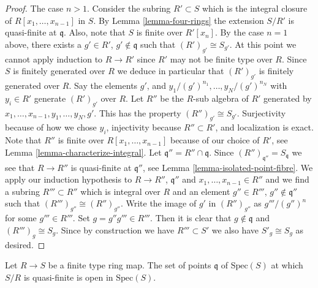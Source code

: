 \begin{proof}
\medskip\noindent
The case $n > 1$. Consider the subring $R' \subset S$
which is the integral closure of $R[x_1, \ldots, x_{n-1}]$
in $S$. By Lemma \ref{lemma-four-rings} the extension
$S/R'$ is quasi-finite at $\mathfrak q$. Also, note
that $S$ is finite over $R'[x_n]$.
By the case $n = 1$ above, there exists a $g' \in R'$,
$g' \not \in \mathfrak q$ such that
$(R')_{g'} \cong S_{g'}$. At this point we cannot
apply induction to $R \to R'$ since $R'$ may not be finite type over $R$.
Since $S$ is finitely generated over $R$ we deduce in particular
that $(R')_{g'}$ is finitely generated over $R$. Say
the elements $g'$, and $y_1/(g')^{n_1}, \ldots, y_N/(g')^{n_N}$
with $y_i \in R'$
generate $(R')_{g'}$ over $R$. Let $R''$ be the $R$-sub algebra
of $R'$ generated by $x_1, \ldots, x_{n-1}, y_1, \ldots, y_N, g'$.
This has the property $(R'')_{g'} \cong S_{g'}$. Surjectivity
because of how we chose $y_i$, injectivity because
$R'' \subset R'$, and localization is exact. Note that
$R''$ is finite over $R[x_1, \ldots, x_{n-1}]$ because
of our choice of $R'$, see Lemma \ref{lemma-characterize-integral}.
Let $\mathfrak q'' = R'' \cap \mathfrak q$. Since
$(R'')_{\mathfrak q''} = S_{\mathfrak q}$ we see that
$R \to R''$ is quasi-finite at $\mathfrak q''$, see
Lemma \ref{lemma-isolated-point-fibre}.
We apply our induction hypothesis to $R \to R''$, $\mathfrak q''$
and $x_1, \ldots, x_{n-1} \in R''$ and we find a subring
$R''' \subset R''$ which is integral over $R$ and an
element $g'' \in R'''$, $g'' \not \in \mathfrak q''$
such that $(R''')_{g''} \cong (R'')_{g''}$. Write the image of $g'$ in
$(R'')_{g''}$ as $g'''/(g'')^n$ for some $g''' \in  R'''$.
Set $g = g''g''' \in R'''$. Then it is clear that $g \not\in
\mathfrak q$ and $(R''')_g \cong S_g$. Since by construction
we have $R''' \subset S'$ we also have $S'_g \cong S_g$ as desired.
\end{proof}

\begin{lemma}
\label{lemma-quasi-finite-open}
Let $R \to S$ be a finite type ring map.
The set of points $\mathfrak q$ of $\text{Spec}(S)$ at which
$S/R$ is quasi-finite is open in $\text{Spec}(S)$.
\end{lemma}

